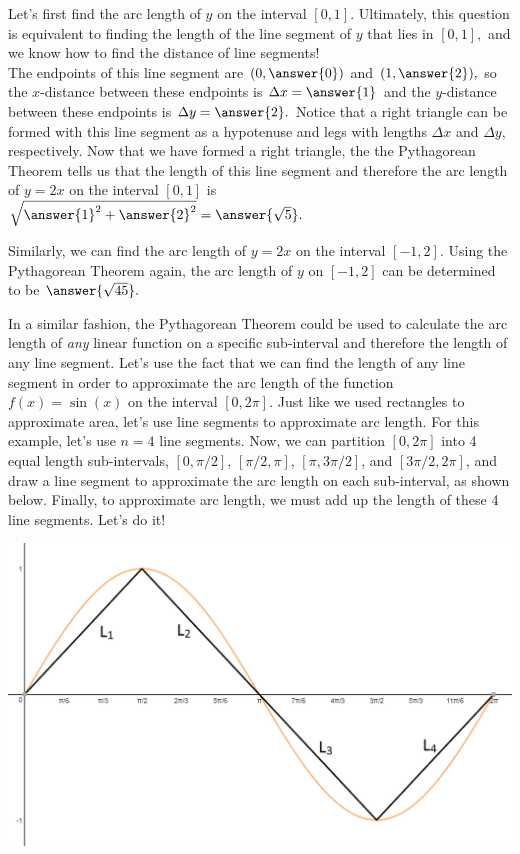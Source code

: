 \documentclass[handout,nooutcomes]{ximera}
\begin{document}
\begin{problem}
Let's first find the arc length of $y$ on the interval $[0,1]$.  Ultimately, this question is equivalent to finding the length of the line segment of $y$ that lies in $[0,1],$ and we know how to find the distance of line segments!  \\

The endpoints of this line segment are $(0,\answer{0})$ and $(1,\answer{2}),$ so the $x$-distance between these endpoints is $\Delta x = \answer{1}$ and the $y$-distance between these endpoints is $\Delta y = \answer{2}.$  Notice that a right triangle can be formed with this line segment as a hypotenuse and legs with lengths $\Delta x$ and $\Delta y$, respectively.  Now that we have formed a right triangle, the the Pythagorean Theorem tells us that the length of this line segment and therefore the arc length of $y = 2x$ on the interval $[0,1]$ is $\sqrt{{\answer{1}}^2+{\answer{2}}^2} = \answer{\sqrt{5}}.$
\end{problem}

\begin{problem}
Similarly, we can find the arc length of $y=2x$ on the interval $[-1,2].$  Using the Pythagorean Theorem again, the arc length of $y$ on $[-1,2]$ can be determined to be $\answer{\sqrt{45}}.$
\end{problem}

In a similar fashion, the Pythagorean Theorem could be used to calculate the arc length of \textit{any} linear function on a specific sub-interval and therefore the length of any line segment.  Let's use the fact that we can find the length of any line segment in order to approximate the arc length of the function $f(x) = \sin(x)$ on the interval $[0, 2\pi]$.  Just like we used rectangles to approximate area, let's use line segments to approximate arc length.  For this example, let's use $n=4$ line segments.  Now, we can partition $[0, 2\pi]$ into 4 equal length sub-intervals, $[0, \pi/2]$, $[\pi/2, \pi]$, $[\pi, 3\pi/2]$, and $[3\pi/2, 2\pi]$, and draw a line segment to approximate the arc length on each sub-interval, as shown below.  Finally, to approximate arc length, we must add up the length of these 4 line segments.  Let's do it! \\

\begin{center} \includegraphics{sinxsegments.png} \end{center}
\end{document}
